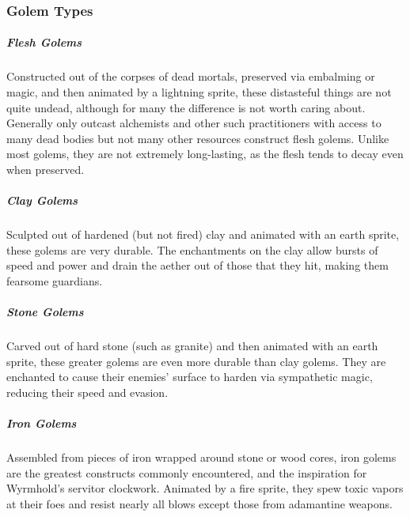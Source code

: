 \subsubsection{Golem Types}
\subparagraph*{Flesh Golems} Constructed out of the corpses of dead mortals, preserved via embalming or magic, and then animated by a lightning sprite, these distasteful things are not quite undead, although for many the difference is not worth caring about. Generally only outcast alchemists and other such practitioners with access to many dead bodies but not many other resources construct flesh golems. Unlike most golems, they are not extremely long-lasting, as the flesh tends to decay even when preserved.
\subparagraph*{Clay Golems} Sculpted out of hardened (but not fired) clay and animated with an earth sprite, these golems are very durable. The enchantments on the clay allow bursts of speed and power and drain the aether out of those that they hit, making them fearsome guardians.
\subparagraph*{Stone Golems} Carved out of hard stone (such as granite) and then animated with an earth sprite, these greater golems are even more durable than clay golems. They are enchanted to cause their enemies' surface to harden via sympathetic magic, reducing their speed and evasion.
\subparagraph*{Iron Golems} Assembled from pieces of iron wrapped around stone or wood cores, iron golems are the greatest constructs commonly encountered, and the inspiration for Wyrmhold's servitor clockwork. Animated by a fire sprite, they spew toxic vapors at their foes and resist nearly all blows except those from adamantine weapons.

